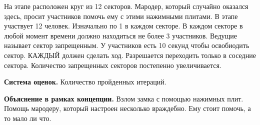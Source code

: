 
\par На этапе расположен круг из 12 секторов. Мародер, который случайно оказался здесь, просит участников помочь ему с этими нажимными плитами. В этапе участвует 12 человек. Изначально по 1 в каждом секторе. В каждом секторе в любой момент времени должно находиться не более 3 участников. Ведущие называет сектор запрещенным. У участников есть 10 секунд чтобы освобиодить сектор. КАЖДЫЙ должен сделать ход. Разрешается переходить только в соседние сектора. Количество запрещенных секторов постепенно увеличивается.

\par \textbf{Система оценок.} Количество пройденных итераций.

\par \textbf{Объяснение в рамках концепции.} Взлом замка с помощью нажимных плит. Помощь мародеру, который настроен несколько враждебно. Ему стоит помочь, а то мало ли что.